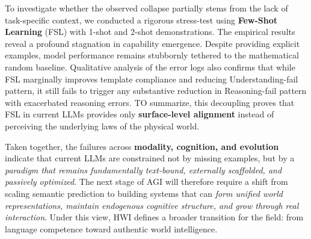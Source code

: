 To investigate whether the observed collapse partially stems from the lack of task-specific context, we conducted a rigorous stress-test using \textbf{Few-Shot Learning} (FSL) with 1-shot and 2-shot demonstrations. 
The empirical results reveal a profound stagnation in capability emergence. Despite providing explicit examples, model performance remains stubbornly tethered to the mathematical random baseline. 
Qualitative analysis of the error logs also confirms that while FSL marginally improves template compliance and reducing Understanding-fail pattern, it still fails to trigger any substantive reduction in Reasoning-fail pattern with exacerbated reasoning errors. 
TO summarize, this decoupling proves that FSL in current LLMs provides only \textbf{surface-level alignment} instead of perceiving the underlying laws of the physical world. 

Taken together, the failures across \textbf{modality, cognition, and evolution} indicate that current LLMs are constrained not by missing examples, but by a \emph{paradigm that remains fundamentally text-bound, externally scaffolded, and passively optimized}. 
The next stage of AGI will therefore require a shift from scaling semantic prediction to building systems that can \emph{form unified world representations, maintain endogenous cognitive structure, and grow through real interaction}. 
Under this view, HWI defines a broader transition for the field: from language competence toward authentic world intelligence.

